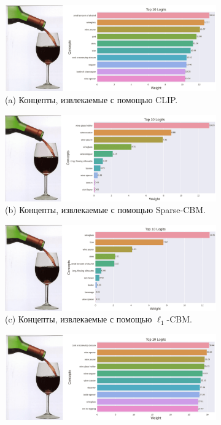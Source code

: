\begin{figure}[h] %
\centering
   \begin{subfigure}%
     \centering
    \includegraphics[width=0.65\linewidth]{./figures/clip_im_4-compressed.png}
    \\
    (a) Концепты, извлекаемые с помощью CLIP.
    \end{subfigure}
    \begin{subfigure}%
    \centering
      \includegraphics[width=0.65\linewidth]{./figures/sparse_im_4-compressed.png}
    \\
    (b) Концепты, извлекаемые с помощью Sparse-CBM.
    \end{subfigure}
    \begin{subfigure}%
     \centering
  \includegraphics[width=0.65\linewidth]{./figures/l1_im_4-compressed.png}
    \\
    (c) Концепты, извлекаемые с помощью $\ell_1$-CBM.
    \end{subfigure}
        \begin{subfigure}%
     \centering
  \includegraphics[width=0.65\linewidth]{./figures/contr_im_4-compressed.png}

\end{subfigure}
\end{figure}
